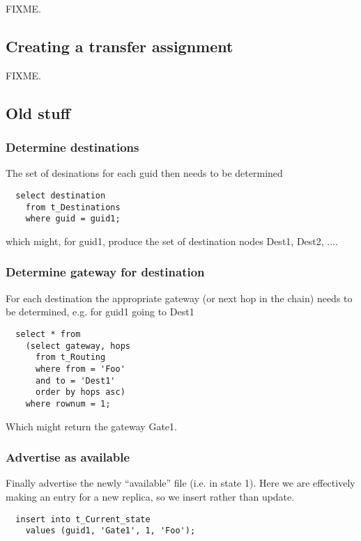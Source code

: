\documentclass{cmspaper}
\begin{document}
FIXME.

\subsection{Creating a transfer assignment}

FIXME.

\subsection{Old stuff}
\subsubsection{Determine destinations}
The set of desinations for each guid then needs to be determined

{\small\begin{verbatim}
  select destination
    from t_Destinations
    where guid = guid1;
\end{verbatim}}

which might, for guid1, produce the set of destination nodes {Dest1, Dest2, ...}. 

\subsubsection{Determine gateway for destination}
For each destination the appropriate gateway (or next hop in the chain) needs to be determined, e.g. for guid1 going to Dest1

{\small\begin{verbatim}
  select * from
    (select gateway, hops
      from t_Routing
      where from = 'Foo'
      and to = 'Dest1'
      order by hops asc)
    where rownum = 1;
\end{verbatim}}

Which might return the gateway Gate1. 

\subsubsection{Advertise as available}

Finally advertise the newly ``available'' file (i.e. in state 1). Here we are effectively making an entry for a new replica, so we insert rather than update.

{\small\begin{verbatim}
  insert into t_Current_state
    values (guid1, 'Gate1', 1, 'Foo');
\end{verbatim}}
\end{document}
